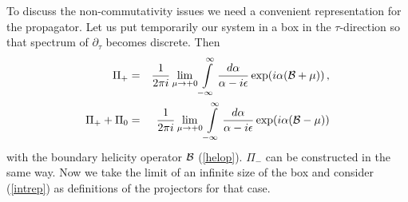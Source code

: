 \documentclass[a4paper,12pt,twoside]{article}
\begin{document}
To discuss the non-commutativity issues we need a convenient representation
for the propagator. Let us put temporarily our system in a box in the
$\tau$-direction so that spectrum of $\partial_\tau$ becomes discrete.
Then 
\begin{eqnarray}
\Pi_+&=&\frac 1{2\pi i}\lim_{\mu\to +0}\int\limits_{-\infty}^{\infty}
\frac{d\alpha}{\alpha -i\epsilon} \exp (i\alpha ({\cal B}+\mu)) \,,\nonumber \\
\Pi_++\Pi_0&=&\frac 1{2\pi i}\lim_{\mu\to +0}\int\limits_{-\infty}^{\infty}
\frac{d\alpha}{\alpha -i\epsilon} \exp (i\alpha ({\cal B}-\mu))
\label{intrep}
\end{eqnarray}
with the boundary helicity operator ${\cal B}$ (\ref{helop}). $\Pi_-$ can be
constructed in the same way. Now we take the limit of an infinite size
of the box and consider (\ref{intrep}) as definitions of the projectors
for that case. 
\end{document}
